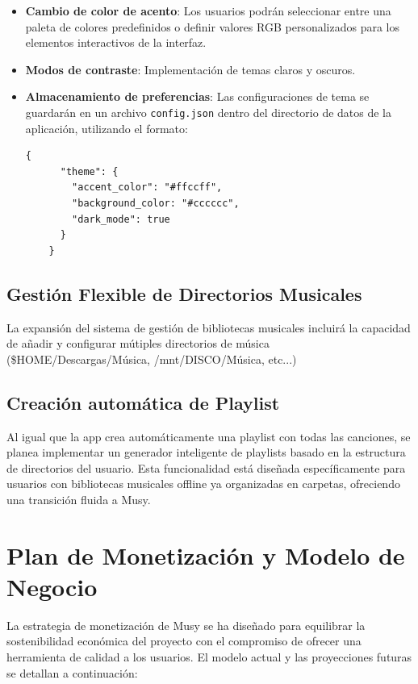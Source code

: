 \documentclass[11pt, a4paper]{article}
\begin{document}
  \begin{itemize}
    \item \textbf{Cambio de color de acento}: Los usuarios podrán seleccionar entre una paleta de colores predefinidos o definir valores RGB personalizados para los elementos interactivos de la interfaz.

    \item \textbf{Modos de contraste}: Implementación de temas claros y oscuros.

    \item \textbf{Almacenamiento de preferencias}: Las configuraciones de tema se guardarán en un archivo \texttt{config.json} dentro del directorio de datos de la aplicación, utilizando el formato:

    \begin{lstlisting}[caption={config.json}]
    {
      "theme": {
        "accent_color": "#ffccff",
        "background_color: "#cccccc",
        "dark_mode": true
      }
    }
    \end{lstlisting}

  \end{itemize}

  \subsection{Gestión Flexible de Directorios Musicales}

  La expansión del sistema de gestión de bibliotecas musicales incluirá la capacidad de añadir y configurar mútiples directorios de música (\$HOME/Descargas/Música, /mnt/DISCO/Música, etc...)

  \subsection{Creación automática de Playlist}

  Al igual que la app crea automáticamente una playlist con todas las canciones, se planea implementar un generador inteligente de playlists basado en la estructura de directorios del usuario. Esta funcionalidad está diseñada específicamente para usuarios con bibliotecas musicales offline ya organizadas en carpetas, ofreciendo una transición fluida a Musy.

\section{Plan de Monetización y Modelo de Negocio}

La estrategia de monetización de Musy se ha diseñado para equilibrar la sostenibilidad económica del proyecto con el compromiso de ofrecer una herramienta de calidad a los usuarios. El modelo actual y las proyecciones futuras se detallan a continuación:
\end{document}
